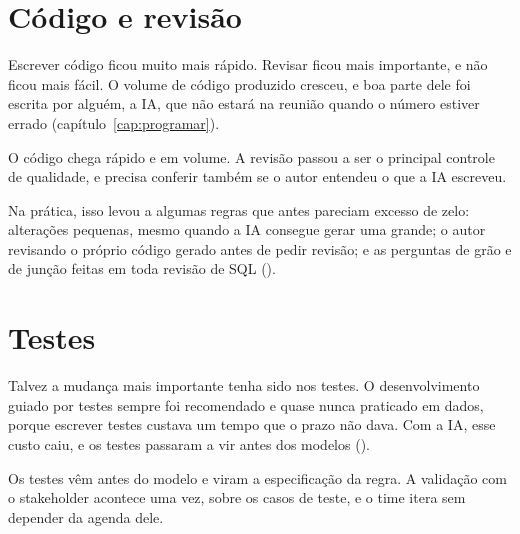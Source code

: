 
\section{Código e revisão}
\label{sec:ad-codigo}

Escrever código ficou muito mais rápido. Revisar ficou mais importante, e não ficou mais fácil.
O volume de código produzido cresceu, e boa parte dele foi escrita por alguém, a IA, que não
estará na reunião quando o número estiver errado (capítulo~\ref{cap:programar}).

{O código chega rápido e em volume. A revisão passou a ser o principal controle de qualidade, e
precisa conferir também se o autor entendeu o que a IA escreveu.}

Na prática, isso levou a algumas regras que antes pareciam excesso de zelo: alterações pequenas,
mesmo quando a IA consegue gerar uma grande; o autor revisando o próprio código gerado antes de
pedir revisão; e as perguntas de grão e de junção feitas em toda revisão de SQL
().


\section{Testes}
\label{sec:ad-testes}

Talvez a mudança mais importante tenha sido nos testes. O desenvolvimento guiado por testes
sempre foi recomendado e quase nunca praticado em dados, porque escrever testes custava um tempo
que o prazo não dava. Com a IA, esse custo caiu, e os testes passaram a vir antes dos modelos
().

{Os testes vêm antes do modelo e viram a especificação da regra. A validação com o stakeholder
acontece uma vez, sobre os casos de teste, e o time itera sem depender da agenda dele.}


